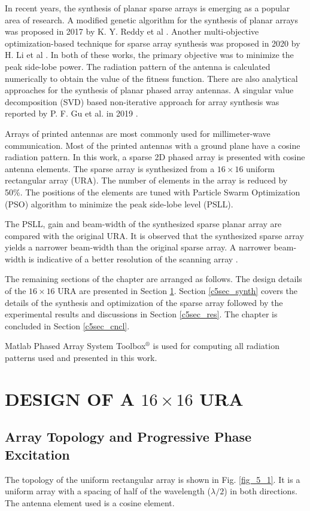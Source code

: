 In recent years, the synthesis of planar sparse arrays is emerging as a popular area of research. A modified genetic algorithm for the synthesis of planar arrays was proposed in 2017 by K. Y. Reddy et al \cite{randomlySpacedArray}. Another multi-objective optimization-based technique for sparse array synthesis was proposed in 2020 by H. Li et al \cite{selfOrgOpt}. In both of these works, the primary objective was to minimize the peak side-lobe power. The radiation pattern of the antenna is calculated numerically to obtain the value of the fitness function. There are also analytical approaches for the synthesis of planar phased array antennas. A singular value decomposition (SVD) based non-iterative approach for array synthesis was reported by P. F. Gu et al. in 2019 \cite{SyntLargeSparse}.

Arrays of printed antennas are most commonly used for millimeter-wave communication. Most of the printed antennas with a ground plane have a cosine radiation pattern. In this work, a sparse 2D phased array is presented with cosine antenna elements. The sparse array is synthesized from a $16\times 16$ uniform rectangular array (URA). The number of elements in the array is reduced by 50\%. The positions of the elements are tuned with Particle Swarm Optimization (PSO) algorithm to minimize the peak side-lobe level (PSLL).

The PSLL, gain and beam-width of the synthesized sparse planar array are compared with the original URA. It is observed that the synthesized sparse array yields a narrower beam-width than the original sparse array. A narrower beam-width is indicative of a better resolution of the scanning array \cite{sparseDesignConstraints}.

The remaining sections of the chapter are arranged as follows. The design details of the $16\times16$ URA are presented in Section \ref{c5sec_design}. Section \ref{c5sec_synth} covers the details of the synthesis and optimization of the sparse array followed by the experimental results and discussions in Section \ref{c5sec_res}. The chapter is concluded in Section \ref{c5sec_cncl}.

Matlab Phased Array System Toolbox$^{\circledR}$ is used for computing all radiation patterns used and presented in this work.

\section{DESIGN OF A $16\times16$ URA}\label{c5sec_design}
\subsection{Array Topology and Progressive Phase Excitation}
The topology of the uniform rectangular array is shown in Fig. \ref{fig_5_1}. It is a uniform array with a spacing of half of the wavelength ($\lambda/2$) in both directions. The antenna element used is a cosine element.

